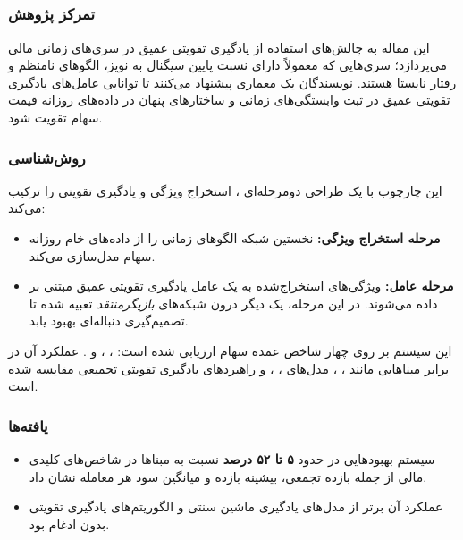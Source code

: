 \documentclass[12pt, a4paper]{report}
\begin{document}
\subsection{ \cite{zou2022cascaded}}

\subsubsection{تمرکز پژوهش}
این مقاله به چالش‌های استفاده از یادگیری تقویتی عمیق در سری‌های زمانی مالی می‌پردازد؛ سری‌هایی که معمولاً دارای نسبت پایین سیگنال به نویز، الگوهای نامنظم و رفتار نایستا هستند. نویسندگان یک معماری  پیشنهاد می‌کنند تا توانایی عامل‌های یادگیری تقویتی عمیق در ثبت وابستگی‌های زمانی و ساختارهای پنهان در داده‌های روزانه قیمت سهام تقویت شود.

\subsubsection{روش‌شناسی}
این چارچوب با یک طراحی دو‌مرحله‌ای ، استخراج ویژگی و یادگیری تقویتی را ترکیب می‌کند:
\begin{itemize}
    \item \textbf{مرحله استخراج ویژگی:} نخستین شبکه  الگوهای زمانی را از داده‌های خام روزانه سهام مدل‌سازی می‌کند.  
    \item \textbf{مرحله عامل:} ویژگی‌های استخراج‌شده به یک عامل یادگیری تقویتی عمیق مبتنی بر  داده می‌شوند. در این مرحله، یک  دیگر درون شبکه‌های \textit{بازیگر\lr{-}منتقد} تعبیه شده تا تصمیم‌گیری دنباله‌ای بهبود یابد.  
\end{itemize}

\noindent این سیستم بر روی چهار شاخص عمده سهام ارزیابی شده است: ، ،  و . عملکرد آن در برابر مبناهایی مانند ، ، مدل‌های ، ،  و راهبردهای یادگیری تقویتی تجمیعی مقایسه شده است.

\subsubsection{یافته‌ها}
\begin{itemize}
    \item سیستم  بهبودهایی در حدود \textbf{۵ تا ۵۲ درصد} نسبت به مبناها در شاخص‌های کلیدی مالی از جمله بازده تجمعی، بیشینه بازده و میانگین سود هر معامله نشان داد.  
    \item عملکرد آن برتر از مدل‌های یادگیری ماشین سنتی و الگوریتم‌های یادگیری تقویتی بدون ادغام  بود.  
\end{itemize}
\end{document}
